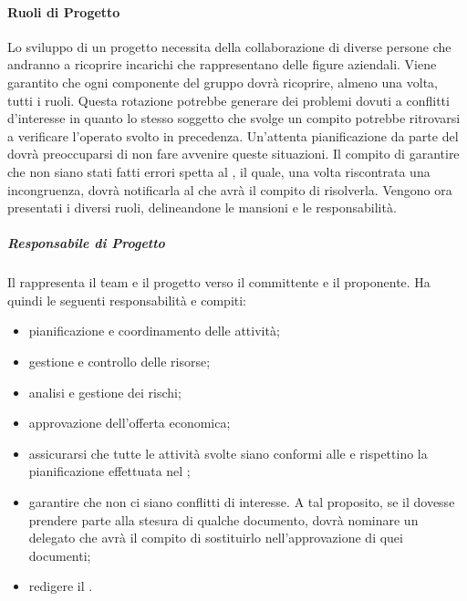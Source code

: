 			\paragraph{Ruoli di Progetto}
			Lo sviluppo di un progetto necessita della collaborazione di diverse persone che andranno a ricoprire incarichi che rappresentano delle figure aziendali. \newline
			Viene garantito che ogni componente del gruppo \groupName{} dovrà ricoprire, almeno una volta, tutti i ruoli. \newline
			Questa rotazione potrebbe generare dei problemi dovuti a conflitti d'interesse in quanto lo stesso soggetto che svolge un compito potrebbe ritrovarsi a verificare l'operato svolto in precedenza. \newline
			Un'attenta pianificazione da parte del \roleProjectManager{} dovrà preoccuparsi di non fare avvenire queste situazioni. \newline
			Il compito di garantire che non siano stati fatti errori spetta al \roleVerifier, il quale, una volta riscontrata una incongruenza, dovrà notificarla al \roleProjectManager{} che avrà il compito di risolverla. \newline 
			Vengono ora presentati i diversi ruoli, delineandone le mansioni e le responsabilità.
				\subparagraph{Responsabile di Progetto}
				Il \roleProjectManager{} rappresenta il team e il progetto verso il committente e il proponente. \newline
				Ha quindi le seguenti responsabilità e compiti:
					\begin{itemize}
						\item pianificazione e coordinamento delle attività;
						\item gestione e controllo delle risorse;
						\item analisi e gestione dei rischi;
						\item approvazione dell'offerta economica;
						\item assicurarsi che tutte le attività svolte siano conformi alle \docNameVersionNdP{} e rispettino la pianificazione effettuata nel \docNameVersionPdP;
						\item garantire che non ci siano conflitti di interesse. A tal proposito, se il \roleProjectManager{} dovesse prendere parte alla stesura di qualche documento, dovrà nominare un \roleProjectManager{} delegato che avrà il compito di sostituirlo nell'approvazione di quei documenti;
						\item redigere il \docNameVersionPdP.
					\end{itemize}
					
